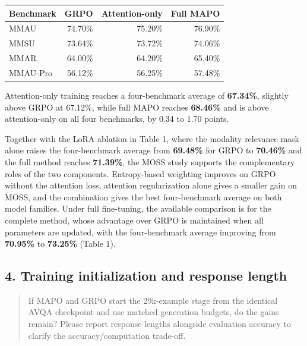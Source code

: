 \par\medskip
\begingroup
\small
\setlength{\tabcolsep}{5pt}
\renewcommand{\arraystretch}{1.2}
\noindent\begin{tabularx}{\linewidth}{@{}LRRR@{}}
\toprule
\textbf{Benchmark} & \textbf{GRPO} & \textbf{Attention-only} & \textbf{Full MAPO} \\
\midrule
MMAU & 74.70\% & 75.20\% & 76.90\% \\
MMSU & 73.64\% & 73.72\% & 74.06\% \\
MMAR & 64.00\% & 64.20\% & 65.40\% \\
MMAU-Pro & 56.12\% & 56.25\% & 57.48\% \\
\bottomrule
\end{tabularx}
\par\endgroup\medskip

Attention-only training reaches a four-benchmark average of \textbf{67.34\%}, slightly above GRPO at 67.12\%, while full MAPO reaches \textbf{68.46\%} and is above attention-only on all four benchmarks, by 0.34 to 1.70 points.

Together with the LoRA ablation in Table 1, where the modality relevance mask alone raises the four-benchmark average from \textbf{69.48\%} for GRPO to \textbf{70.46\%} and the full method reaches \textbf{71.39\%}, the MOSS study supports the complementary roles of the two components. Entropy-based weighting improves on GRPO without the attention loss, attention regularization alone gives a smaller gain on MOSS, and the combination gives the best four-benchmark average on both model families. Under full fine-tuning, the available comparison is for the complete method, whose advantage over GRPO is maintained when all parameters are updated, with the four-benchmark average improving from \textbf{70.95\%} to \textbf{73.25\%} (Table 1).

\subsection*{4. Training initialization and response length}

\begin{quote}\small\color{ReviewQuote}
If MAPO and GRPO start the 29k-example stage from the identical AVQA checkpoint and use matched generation budgets, do the gains remain? Please report response lengths alongside evaluation accuracy to clarify the accuracy/computation trade-off.

\end{quote}

